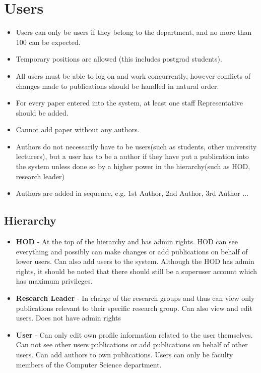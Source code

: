 \documentclass[12pt, letterpaper, twoside]{article}
\begin{document}
\section{Users}
\begin{itemize}  

    \item Users can only be users if they belong to the department, and no more than 100 can be expected.
    \item Temporary positions are allowed (this includes postgrad students).
    \item All users must be able to log on and work concurrently, however conflicts of changes made to publications should be handled in natural order.
    \item For every paper entered into the system, at least one staff Representative should be added.
    \item Cannot add paper without any authors.
    \item Authors do not necessarily have to be users(such as students, other university lecturers), but a user has to be a author if they have put a publication into the system unless done so by a higher power in the hierarchy(such as HOD, research leader)
    \item Authors are added in sequence, e.g. 1st Author, 2nd Author, 3rd Author ...


\end{itemize}
\subsection{Hierarchy}
\begin{itemize}  

    \item \textbf{HOD} - At the top of the hierarchy and has admin rights. HOD can see everything and possibly can make changes or add publications on behalf of lower users. Can also add users to the system. Although the HOD has admin rights, it should be noted that there should still be a superuser account which has maximum privileges.

    \item \textbf{Research Leader} - In charge of the research groups and thus can view only publications relevant to their specific research group. Can also view and edit users. Does not have admin rights
    
    \item \textbf{User} - Can only edit own profile information related to the user themselves. Can not see other users publications or add publications on behalf of other users. Can add authors to own publications. Users can only be faculty members of the Computer Science department.


\end{itemize}
\end{document}
